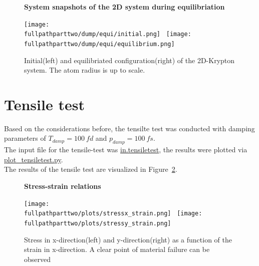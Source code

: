 \documentclass[10pt,a4paper]{report}
\def \pathparttwo {../../2_Two-dimensional_atomic_tensile_test}
\def \fullpathparttwo {/home/lukas/Desktop/project/independence/atomistic_modeling/exam/2_Two-dimensional_atomic_tensile_test}
\newcommand*{\figuretitle}[1]{%
    {\centering%
    \textbf{#1}%
    \par\medskip}%
}
\begin{document}
\begin{center}
\begin{figure}[h]
\figuretitle{System snapshots of the 2D system during equilibriation}
\texttt{[image: \\fullpathparttwo/dump/equi/initial.png]}~
\texttt{[image: \\fullpathparttwo/dump/equi/equilibrium.png]}
\caption[System snapshots of the 2D system during equilibriation]{Initial(left) and equilibriated configuration(right) of the 2D-Krypton system. The atom radius is up to scale.}
\label{fig:p2_equi_ovito}
\end{figure}
\end{center}



\section{Tensile test}
Based on the considerations before, the tensilte test was conducted with damping parameters of $T_{damp}=100~fd$ and $p_{damp}=100~fs$.\\
The input file for the tensile-test was \href{\pathparttwo/in.tensiletest}{in.tensiletest}, the results were plotted via \href{\pathparttwo/plot_tensiletest.py}{plot\_tensiletest.py}.\\
The results of the tensile test are visualized in Figure~\ref{fig:p2_stress_strain_relation}.





\begin{center}
\begin{figure}[h]
\figuretitle{Stress-strain relations}
\texttt{[image: \\fullpathparttwo/plots/stressx\_strain.png]}~
\texttt{[image: \\fullpathparttwo/plots/stressy\_strain.png]}
\caption[Stress-strain relations]{Stress in x-direction(left) and y-direction(right) as a function of the strain in x-direction. A clear point of material failure can be observed  }
\label{fig:p2_stress_strain_relation}
\end{figure}
\end{center}
\end{document}

